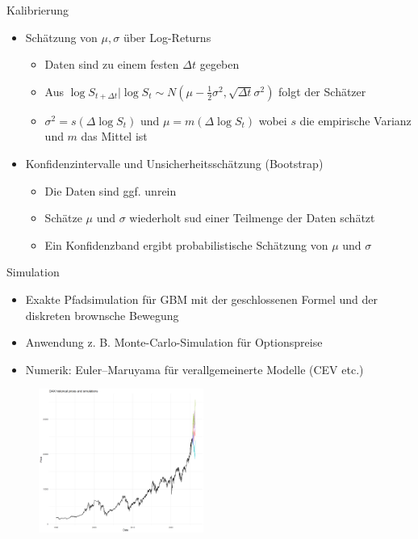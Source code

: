 \documentclass{beamer}
\begin{document}
\begin{frame}{Kalibrierung}
  \begin{itemize}
      \item Schätzung von $\mu,\sigma$ über Log-Returns
      \begin{itemize}
        \item Daten sind zu einem festen $\Delta t$ gegeben
        \item Aus $\log S_{t + \Delta t} \vert \log S_t \sim N(\mu - \tfrac12 \sigma^2, \sqrt{\Delta t} \sigma^2)$ folgt der Schätzer
        \item $\sigma^2 = s(\Delta \log S_t)$ und $\mu = m(\Delta \log S_t)$ wobei $s$ die empirische Varianz und $m$ das Mittel ist
      \end{itemize}
      \pause
      \item Konfidenzintervalle und Unsicherheitsschätzung (Bootstrap)
      \begin{itemize}
        \item Die Daten sind ggf. unrein
        \item Schätze $\mu$ und $\sigma$ wiederholt sud einer Teilmenge der Daten schätzt
        \item Ein Konfidenzband ergibt probabilistische Schätzung von $\mu$ und $\sigma$
      \end{itemize}
  \end{itemize}
\end{frame}

\begin{frame}{Simulation}
  \begin{itemize}
      \item Exakte Pfadsimulation für GBM mit der geschlossenen Formel und der diskreten brownsche Bewegung
      \item Anwendung z. B. Monte-Carlo-Simulation für Optionspreise
      \item Numerik: Euler--Maruyama für verallgemeinerte Modelle (CEV etc.)
  \end{itemize}
  \begin{figure}
    \centering
  \includegraphics[width=0.48\textwidth]{../thesis/images/dax_monte_carlo.png}
  \end{figure}
\end{frame}
\end{document}
